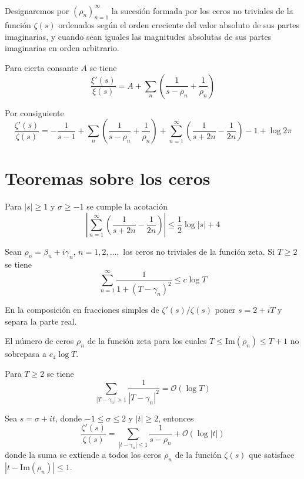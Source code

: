 \documentclass[TAN.tex]{subfiles}
\begin{document}
Designaremos por $(ρ_n)_{n=1}^{∞}$ la sucesión formada por los ceros no triviales de la función $ζ(s)$ ordenados según el orden creciente del valor absoluto de sus partes imaginarias, y cuando sean iguales las magnitudes absolutas de sus partes imaginarias en orden arbitrario.

\begin{coro}
Para cierta consante $A$ se tiene
\[ \frac{ξ'(s)}{ξ(s)} = A + \sum_n \left(\frac{1}{s-ρ_n} + \frac{1}{ρ_n}\right)\]

Por consiguiente
\[ \frac{ζ'(s)}{ζ(s)} = - \frac{1}{s-1} + \sum_n \left(\frac{1}{s-ρ_n} + \frac{1}{ρ_n}\right) + \sum_{n=1}^{∞} \left(\frac{1}{s+2n}-\frac{1}{2n}\right) - 1 + \log 2π\]
\end{coro}

\section{Teoremas sobre los ceros}
\begin{lemma}
Para $|s|≥1$ y $σ ≥ -1$ se cumple la acotación
\[ \left|\sum_{n=1}^{∞} \left(\frac{1}{s+2n}-\frac{1}{2n}\right)\right| ≤ \frac{1}{2} \log |s| + 4 \]
\end{lemma}

\begin{teorema}
Sean $ρ_n = β_n +i γ_n$, $n=1,2,\dots,$ los ceros no triviales de la función zeta. Si $T≥2$ se tiene
\[ \sum_{n=1}^{∞} \frac{1}{1+(T-γ_n)^2} ≤ c \log T \]
\end{teorema}

En la composición en fracciones simples de $ζ'(s)/ζ(s)$ poner $s = 2 + iT$ y separa la parte real.

\begin{coro}
El número de ceros $ρ_n$ de la función zeta para los cuales $T ≤ \text{Im}(ρ_n) ≤ T + 1$ no sobrepasa a $c_4 \log T$.
\end{coro}

\begin{coro}
Para $T≥2$ se tiene
\[ \sum_{|T-γ_n|>1} \frac{1}{|T-γ_n|^2} = \mathcal{O}(\log T) \]
\end{coro}

\begin{coro}
Sea $s = σ + it$, donde $-1≤σ≤2$ y $|t|≥2$, entonces
\[ \frac{ζ'(s)}{ζ(s)} = \sum_{|t-γ_n|≤1} \frac{1}{s-ρ_n} + \mathcal{O}(\log |t|) \]
donde la suma se extiende a todos los ceros $ρ_n$ de la función $ζ(s)$ que satisface $|t-\text{Im}(ρ_n)|≤1$.
\end{coro}
\end{document}
